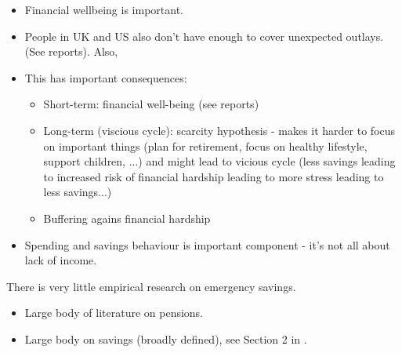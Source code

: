 \begin{itemize}
    \item Financial wellbeing is important.

    \item People in UK and US also don't have enough to cover unexpected
        outlays. (See reports). Also, \citet{sabat2019rules}

    \item This has important consequences:

        \begin{itemize}

            \item Short-term: financial well-being (see reports)

            \item Long-term (viscious cycle): scarcity hypothesis - makes it
                harder to focus on important things (plan for retirement, focus
                on healthy lifestyle, support children, ...) and might lead to
                vicious cycle (less savings leading to increased risk of
                financial hardship leading to more stress leading to less
                savings...)

            \item Buffering agains financial hardship \citep{roll2020income}
        \end{itemize}

    \item Spending and savings behaviour is important component - it's not all
        about lack of income.

\end{itemize}







There is very little empirical research on emergency savings.
\begin{itemize}
    \item Large body of literature on pensions.

    \item Large body on savings (broadly defined), see Section 2 in
        \citet{sabat2019rules}.
\end{itemize}





